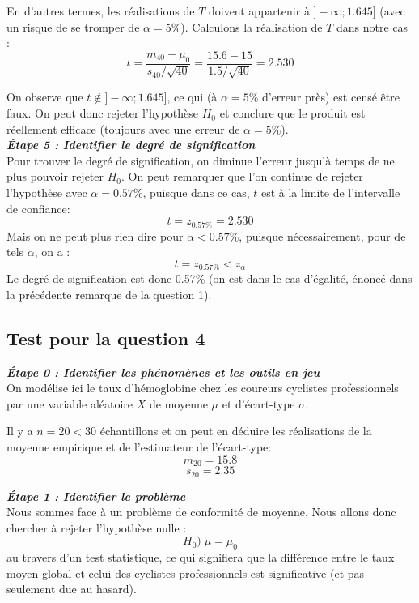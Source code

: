\documentclass[a4paper,oneside,12pt]{article}
\theoremstyle{plain}
\begin{document}
En d'autres termes, les réalisations de $T$ doivent appartenir à $]-\infty;1.645]$ (avec un risque de se tromper de $\alpha = 5\%$). Calculons la réalisation de $T$ dans notre cas :
$$ t = \frac{m_{40}-\mu_0}{s_{40}/\sqrt{40}} =  \frac{15.6-15}{1.5/\sqrt{40}} = 2.530$$
    
On observe que $t\notin ]-\infty;1.645]$, ce qui (à $\alpha = 5\%$ d'erreur près) est censé être faux. On peut donc rejeter l'hypothèse $H_0$ et conclure que le produit est réellement efficace (toujours avec une erreur de $\alpha = 5\%$).\\
    
    
\textit{\textbf{Étape 5 : Identifier le degré de signification}}\\
Pour trouver le degré de signification, on diminue l'erreur jusqu'à temps de ne plus pouvoir rejeter $H_0$. On peut remarquer que l'on continue de rejeter l'hypothèse avec $\alpha = 0.57\%$, puisque dans ce cas, $t$ est à la limite de l'intervalle de confiance:
$$t = z_{0.57\%} = 2.530$$
Mais on ne peut plus rien dire pour $\alpha < 0.57\%$, puisque nécessairement, pour de tels $\alpha$, on a : $$t = z_{0.57\%}< z_{\alpha}$$ 
Le degré de signification est donc 0.57\% (on est dans le cas d'égalité, énoncé dans la précédente remarque de la question 1).\\
    
\subsection*{Test pour la question 4}

\textit{\textbf{Étape 0 : Identifier les phénomènes et les outils en jeu}}\\
On modélise ici le taux d'hémoglobine chez les coureurs cyclistes professionnels par une variable aléatoire $X$ de moyenne $\mu$ et d'écart-type $\sigma$.
    
Il y a $n = 20<30$ échantillons et on peut en déduire les réalisations de la moyenne empirique et de l'estimateur de l'écart-type:
$$m_{20} = 15.8$$
$$s_{20} = 2.35$$
    
\textit{\textbf{Étape 1 : Identifier le problème}}\\
Nous sommes face à un problème de conformité de moyenne. Nous allons donc chercher à rejeter l'hypothèse nulle :
$$H_0) \;\mu=\mu_0$$ 
au travers d'un test statistique, ce qui signifiera que la différence entre le taux moyen global et celui des cyclistes professionnels est significative (et pas seulement due au hasard).\\
    
\end{document}
